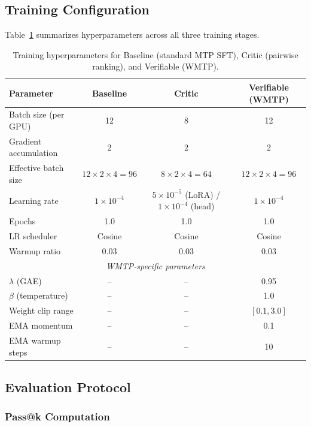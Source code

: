 \subsection{Training Configuration}

Table~\ref{tab:training_config} summarizes hyperparameters across all three training stages.

\begin{table}[h]
\centering
\caption{Training hyperparameters for Baseline (standard MTP SFT), Critic (pairwise ranking), and Verifiable (WMTP).}
\label{tab:training_config}
\begin{tabular}{lccc}
\toprule
\textbf{Parameter} & \textbf{Baseline} & \textbf{Critic} & \textbf{Verifiable (WMTP)} \\
\midrule
Batch size (per GPU) & 12 & 8 & 12 \\
Gradient accumulation & 2 & 2 & 2 \\
Effective batch size & $12 \times 2 \times 4 = 96$ & $8 \times 2 \times 4 = 64$ & $12 \times 2 \times 4 = 96$ \\
Learning rate & $1 \times 10^{-4}$ & $5 \times 10^{-5}$ (LoRA) / $1 \times 10^{-4}$ (head) & $1 \times 10^{-4}$ \\
Epochs & 1.0 & 1.0 & 1.0 \\
LR scheduler & Cosine & Cosine & Cosine \\
Warmup ratio & 0.03 & 0.03 & 0.03 \\
\midrule
\multicolumn{4}{c}{\textit{WMTP-specific parameters}} \\
\midrule
$\lambda$ (GAE) & -- & -- & 0.95 \\
$\beta$ (temperature) & -- & -- & 1.0 \\
Weight clip range & -- & -- & $[0.1, 3.0]$ \\
EMA momentum & -- & -- & 0.1 \\
EMA warmup steps & -- & -- & 10 \\
\bottomrule
\end{tabular}
\end{table}

\subsection{Evaluation Protocol}

\subsubsection{Pass@k Computation}

